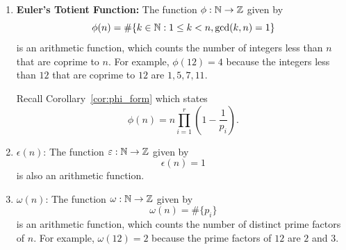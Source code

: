 \begin{enumerate}
    \begin{prop}\label{prop:sigmamul}
        $\sigma(n) = \prod_{i=1}^r \frac{p_i^{\alpha_i + 1} - 1}{p_i - 1}$.
    \end{prop}
    \begin{proof} 
        In order to evaluate $\sigma(n)$, consider the product \[(1 + p_1 + p_1^2 + \cdots + p_1^{\alpha_1})(1 + p_2 + p_2^2 + \cdots + p_2^{\alpha_2}) \cdots (1 + p_r + p_r^2 + \cdots + p_r^{\alpha_r}).\] The expansion of this product will yield all possible terms of the form $p_1^{\beta_1} p_2^{\beta_2} \cdots p_r^{\beta_r}$, where $0 \leq \beta_i \leq \alpha_i$. Each such term corresponds to a divisor of $n$ and all the divisors of $n$ can be obtained by varying the $\beta_i$'s. Hence, 
        \begin{align*}
            \sigma(n) &= (1 + p_1 + p_1^2 + \cdots + p_1^{\alpha_1})(1 + p_2 + p_2^2 + \cdots + p_2^{\alpha_2}) \\ &\cdots (1 + p_r + p_r^2 + \cdots + p_r^{\alpha_r})\\
            &= \frac{p_1^{\alpha_1 + 1} - 1}{p_1 - 1} \cdot \frac{p_2^{\alpha_2 + 1} - 1}{p_2 - 1} \cdots \frac{p_r^{\alpha_r + 1} - 1}{p_r - 1}\\
            &= \prod_{i=1}^r \frac{p_i^{\alpha_i + 1} - 1}{p_i - 1}.
        \end{align*}
    \end{proof}

    \item \textbf{Euler's Totient Function:} The function $\phi: \mathbb{N} \to \mathbb{Z}$ given by \[\phi(n) = \#\{k \in \mathbb{N}: 1 \leq k < n, \gcd(k, n) = 1\}\] is an arithmetic function, which counts the number of integers less than $n$ that are coprime to $n$. For example, $\phi(12) = 4$ because the integers less than $12$ that are coprime to $12$ are $1, 5, 7, 11$.
    
    Recall Corollary~\ref{cor:phi_form} which states \[\phi(n) = n \prod_{i=1}^r\left(1-\frac{1}{p_i}\right).\]

    \item $\epsilon(n)$: The function $\varepsilon: \mathbb{N} \to \mathbb{Z}$ given by \[\epsilon(n) =1\] is also an arithmetic function.
    
    \item $\omega(n)$: The function $\omega: \mathbb{N} \to \mathbb{Z}$ given by \[\omega(n) = \#\{p_i\}\] is an arithmetic function, which counts the number of distinct prime factors of $n$. For example, $\omega(12) = 2$ because the prime factors of $12$ are $2$ and $3$.
\end{enumerate}

